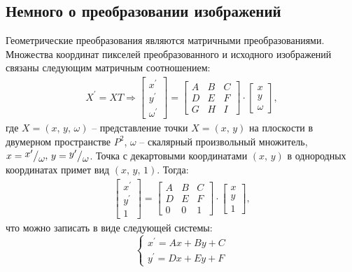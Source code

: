 \documentclass[a4paper, 16pt]{article}
\newcommand{\frc}[2]{\raisebox{2pt}{$#1$}\big/\raisebox{-3pt}{$#2$}}
\begin{document}
\subsection{Немного о преобразовании изображений}
\noindent Геометрические преобразования являются матричными преобразованиями. Множества
координат пикселей преобразованного и исходного изображений связаны следующим матричным
соотношением:
\begin{align*}
    X^{\prime}=XT\Rightarrow
    \begin{bmatrix}
        x^{\prime}\\
        y^{\prime}\\
        \omega^{\prime}
    \end{bmatrix}=
    \begin{bmatrix}
        A &B &C\\
        D &E &F\\
        G &H &I
    \end{bmatrix}\cdot
    \begin{bmatrix}
        x\\
        y\\
        \omega
    \end{bmatrix},
\end{align*}
\noindent где $X=\left(x,\,y,\,\omega\right)$ -- представление точки $X=\left(x,\,y\right)$ на
плоскости в двумерном пространстве $P^2$, $\omega$ -- скалярный произвольный множитель,
$x=\frc{x^{\prime}}{\omega},\,y=\frc{y^{\prime}}{\omega}$. Точка с декартовыми координатами
$\left(x,\,y\right)$ в однородных координатах примет вид $\left(x,\,y,\,1\right)$. Тогда:
\begin{align*}
    \begin{bmatrix}
        x^{\prime}\\
        y^{\prime}\\
        1
    \end{bmatrix}=
    \begin{bmatrix}
        A &B &C\\
        D &E &F\\
        0 &0 &1
    \end{bmatrix}\cdot
    \begin{bmatrix}
        x\\
        y\\
        1
    \end{bmatrix},
\end{align*}
\noindent что можно записать в виде следующей системы:
$$
\begin{cases}
    x^{\prime}=Ax+By+C\\
    y^{\prime}=Dx+Ey+F
\end{cases}
$$
\end{document}
